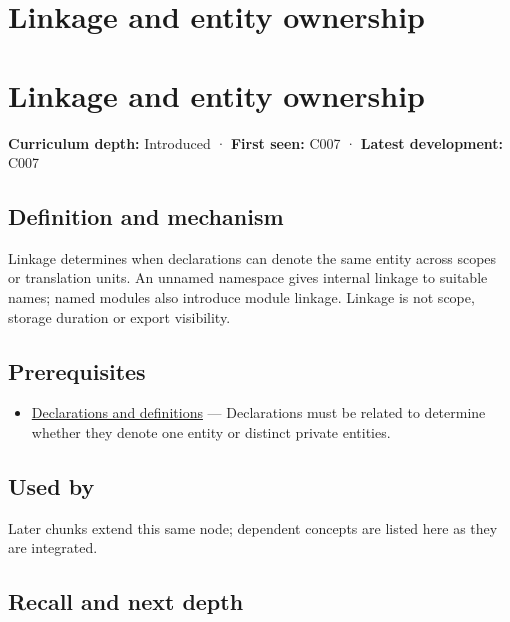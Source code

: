 \hypertarget{appendix-74a0ec818c18}{}
\section*{Linkage and entity ownership}
\section{Linkage and entity ownership}\label{appendix-74a0ec818c18-linkage-and-entity-ownership}

\textbf{Curriculum depth:} Introduced · \textbf{First seen:} C007 · \textbf{Latest development:} C007

\subsection{Definition and mechanism}\label{appendix-74a0ec818c18-definition-and-mechanism}

Linkage determines when declarations can denote the same entity across scopes or translation units. An unnamed namespace gives internal linkage to suitable names; named modules also introduce module linkage. Linkage is not scope, storage duration or export visibility.

\subsection{Prerequisites}\label{appendix-74a0ec818c18-prerequisites}

\begin{itemize}
\tightlist
\item
  \hyperref[appendix-2e4d494c2d94]{Declarations and definitions} --- Declarations must be related to determine whether they denote one entity or distinct private entities.
\end{itemize}

\subsection{Used by}\label{appendix-74a0ec818c18-used-by}

Later chunks extend this same node; dependent concepts are listed here as they are integrated.

\subsection{Recall and next depth}\label{appendix-74a0ec818c18-recall-and-next-depth}

